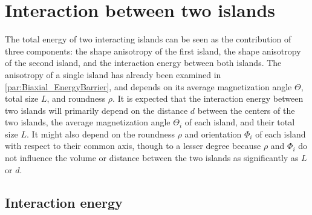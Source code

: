 \documentclass[11pt,a4paper,english,twoside]{article}
\begin{document}
\section{Interaction between two islands}
The total energy of two interacting islands can be seen as the contribution of three components: the shape anisotropy of the first island, the shape anisotropy of the second island, and the interaction energy between both islands. The anisotropy of a single island has already been examined in \cref{par:Biaxial_EnergyBarrier}, and depends on its average magnetization angle $\Theta$, total size $L$, and roundness $\rho$. It is expected that the interaction energy between two islands will primarily depend on the distance $d$ between the centers of the two islands, the average magnetization angle $\Theta_i$ of each island, and their total size $L$. It might also depend on the roundness $\rho$ and orientation $\Phi_i$ of each island with respect to their common axis, though to a lesser degree because $\rho$ and $\Phi_i$ do not influence the volume or distance between the two islands as significantly as $L$ or $d$.

\subsection{Interaction energy}
\label{par:TwoIslands_InteractionAngle}
\end{document}
